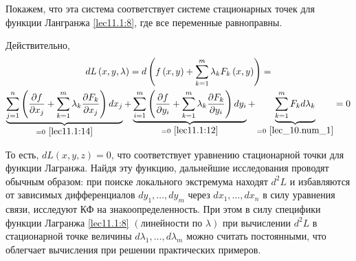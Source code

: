 \documentclass[../../main.tex]{subfiles}
\begin{document}
	Покажем, что эта система соответствует системе стационарных точек для
	функции Лангранжа \eqref{lec11.1:8}, где все переменные равноправны.
	
	Действительно, 
	\begin{multline}
	\label{lec11.1:15}
	dL\left( x, y, \lambda \right) = d\left( f\left( x, y\right) 
	+ \sum\limits_{k=1}^{m}\lambda_k F_k\left( x, y \right) \right) =
	\\
	\underbrace{\sum\limits_{j=1}^{n}\left( 
	\dfrac{\partial f}{\partial x_j} 
	+ \sum\limits_{k=1}^{m}\lambda_k \dfrac{\partial F_k}
	{\partial x_j}  
	\right)d x_j}_{= 0\ \eqref{lec11.1:14}} + \underbrace{\sum\limits_{i=1}^{m} \left( \dfrac{\partial f}{\partial y_i} 
	+ \sum\limits_{k=1}^{m}\lambda_k \dfrac{\partial F_k}{\partial y_i}  \right) dy_i}_{= 0\ \eqref{lec11.1:12}}
	+ \underbrace{\sum\limits_{k=1}^{m} F_k d \lambda_k}
	_{= 0\ \eqref{lec_10.num_1}} = 0
	\end{multline}
	
	То есть, $dL\left( x, y, z \right) = 0$, что соответствует уравнению 
	стационарной точки для функции Лагранжа. Найдя эту функцию, дальнейшие
	исследования проводят обычным образом: при поиске локального экстремума 
	находят $d^2L$ и избавляются от зависимых дифференциалов $d y_1, \ldots, d y_m $ 
	через $d x_1, \ldots, d x_n$ в силу уравнения связи, исследуют КФ на 
	знакоопределенность. При этом в силу специфики функции Лагранжа \eqref{lec11.1:8} 
	$\left( \text{линейности по } \lambda \right) $ при вычислении $d^2 L$
	в стационарной точке величины $d \lambda_1, \ldots, d \lambda_m$ можно
	считать постоянными, что облегчает вычисления при решении практических
	примеров.
	
\end{document}
